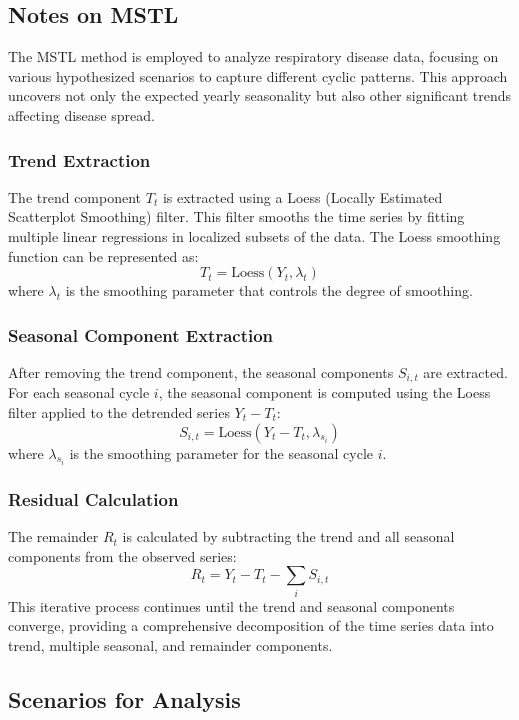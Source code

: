 \documentclass{article}
\begin{document}
\subsection{Notes on MSTL}
The MSTL  method is employed to analyze respiratory disease data, focusing on various hypothesized scenarios to capture different cyclic patterns. This approach uncovers not only the expected yearly seasonality but also other significant trends affecting disease spread.

\subsubsection{Trend Extraction}
The trend component \(T_t\) is extracted using a Loess (Locally Estimated Scatterplot Smoothing) filter. This filter smooths the time series by fitting multiple linear regressions in localized subsets of the data. The Loess smoothing function can be represented as:
\[
T_t = \text{Loess}(Y_t, \lambda_t)
\]
where \(\lambda_t\) is the smoothing parameter that controls the degree of smoothing.

\subsubsection{Seasonal Component Extraction}
After removing the trend component, the seasonal components \(S_{i,t}\) are extracted. For each seasonal cycle \(i\), the seasonal component is computed using the Loess filter applied to the detrended series \(Y_t - T_t\):
\[
S_{i,t} = \text{Loess}(Y_t - T_t, \lambda_{s_i})
\]
where \(\lambda_{s_i}\) is the smoothing parameter for the seasonal cycle \(i\).

\subsubsection{Residual Calculation}
The remainder \(R_t\) is calculated by subtracting the trend and all seasonal components from the observed series:
\[
R_t = Y_t - T_t - \sum_{i} S_{i,t}
\]
This iterative process continues until the trend and seasonal components converge, providing a comprehensive decomposition of the time series data into trend, multiple seasonal, and remainder components.

\subsection{Scenarios for Analysis}
\end{document}

